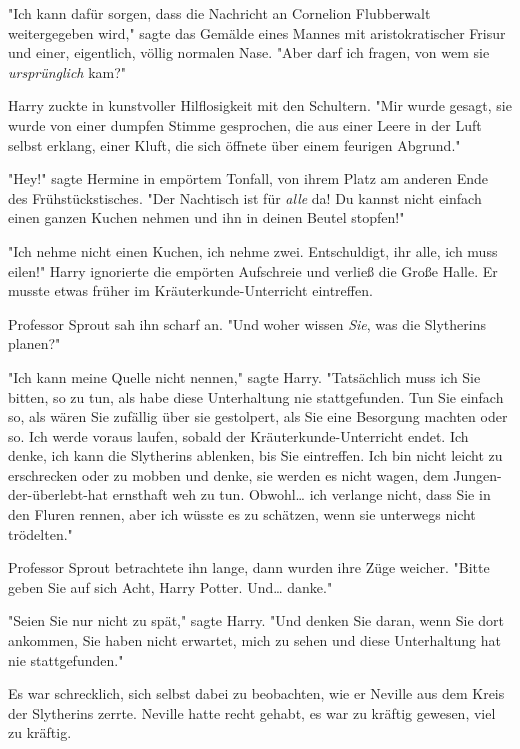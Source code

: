 {\later

"Ich kann dafür sorgen, dass die Nachricht an Cornelion Flubberwalt weitergegeben wird," sagte das Gemälde eines Mannes mit aristokratischer Frisur und einer, eigentlich, völlig normalen Nase. "Aber darf ich fragen, von wem sie \emph{ursprünglich} kam?"

Harry zuckte in kunstvoller Hilflosigkeit mit den Schultern. "Mir wurde gesagt, sie wurde von einer dumpfen Stimme gesprochen, die aus einer Leere in der Luft selbst erklang, einer Kluft, die sich öffnete über einem feurigen Abgrund."

\later

"Hey!" sagte Hermine in empörtem Tonfall, von ihrem Platz am anderen Ende des Frühstückstisches. "Der Nachtisch ist für \emph{alle} da! Du kannst nicht einfach einen ganzen Kuchen nehmen und ihn in deinen Beutel stopfen!"

"Ich nehme nicht einen Kuchen, ich nehme zwei. Entschuldigt, ihr alle, ich muss eilen!" Harry ignorierte die empörten Aufschreie und verließ die Große Halle. Er musste etwas früher im Kräuterkunde-Unterricht eintreffen.

\later

Professor Sprout sah ihn scharf an. "Und woher wissen \emph{Sie}, was die Slytherins planen?"

"Ich kann meine Quelle nicht nennen," sagte Harry. "Tatsächlich muss ich Sie bitten, so zu tun, als habe diese Unterhaltung nie stattgefunden. Tun Sie einfach so, als wären Sie zufällig über sie gestolpert, als Sie eine Besorgung machten oder so. Ich werde voraus laufen, sobald der Kräuterkunde-Unterricht endet. Ich denke, ich kann die Slytherins ablenken, bis Sie eintreffen. Ich bin nicht leicht zu erschrecken oder zu mobben und denke, sie werden es nicht wagen, dem Jungen-der-überlebt-hat ernsthaft weh zu tun. Obwohl… ich verlange nicht, dass Sie in den Fluren rennen, aber ich wüsste es zu schätzen, wenn sie unterwegs nicht trödelten."

Professor Sprout betrachtete ihn lange, dann wurden ihre Züge weicher. "Bitte geben Sie auf sich Acht, Harry Potter. Und… danke."

"Seien Sie nur nicht zu spät," sagte Harry. "Und denken Sie daran, wenn Sie dort ankommen, Sie haben nicht erwartet, mich zu sehen und diese Unterhaltung hat nie stattgefunden."

\later

Es war schrecklich, sich selbst dabei zu beobachten, wie er Neville aus dem Kreis der Slytherins zerrte. Neville hatte recht gehabt, es war zu kräftig gewesen, viel zu kräftig.

}
